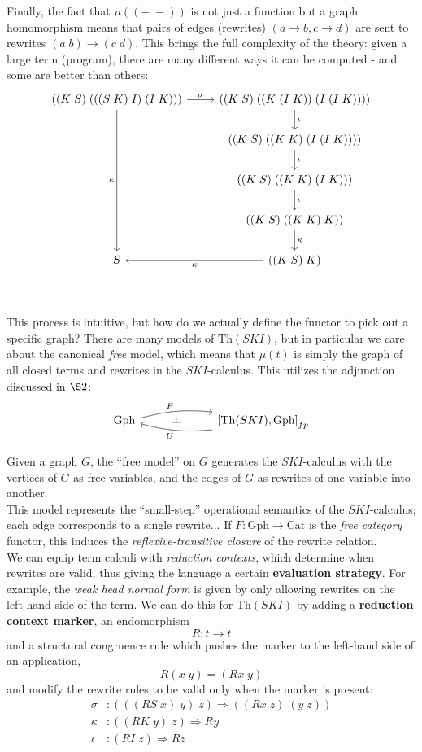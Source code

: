 \documentclass[a4paper,UKenglish]{article}
\theoremstyle{definition}
\def\ld{\rotatebox[origin=c]{-90}{$\dashv$}} %
\newcommand{\Th}{\mathrm{Th}}
\newcommand{\Gph}{\mathrm{Gph}}
\newcommand{\Cat}{\mathrm{Cat}}
\begin{document}
Finally, the fact that $\mu((-\;-))$ is not just a function but a graph homomorphism means that pairs of edges (rewrites) $(a\to b, c\to d)$ are sent to rewrites $(a\; b) \to (c\; d)$. This brings the full complexity of the theory: given a large term (program), there are many different ways it can be computed - and some are better than others:
\[\begin{tikzcd}
	((K\; S)\; (((S\; K)\; I)\; (I\; K))) \arrow[r,"\sigma"] \arrow[dddd,swap,"\kappa"] & ((K\; S)\; ((K\;(I\; K))\; (I\; (I\; K)))) \arrow[d,"\iota"]\\
	& ((K\; S)\; ((K\; K)\; (I\; (I\; K)))) \arrow[d,"\iota"]\\
	& ((K\; S)\; ((K\; K)\; (I\; K))) \arrow[d,"\iota"]\\
	& ((K\; S)\; ((K\; K)\; K)) \arrow[d,"\kappa"]\\
	S & ((K\; S)\; K)\arrow[l,"\kappa"]\\
\end{tikzcd}\]\\

This process is intuitive, but how do we actually define the functor to pick out a specific graph? There are many models of $\Th(SKI)$, but in particular we care about the canonical \textit{free} model, which means that $\mu(t)$ is simply the graph of all closed terms and rewrites in the $SKI$-calculus. This utilizes the adjunction discussed in $\S2$:
\[
\begin{tikzcd}
\Gph \arrow[bend left=10,below]{rr}{F}
& \ld &
\arrow[bend left=10,above]{ll}{U} \left[\Th(SKI),\Gph\right]_{fp}
\end{tikzcd}
\]

Given a graph $G$, the ``free model'' on $G$ generates the $SKI$-calculus with the vertices of $G$ as free variables, and the edges of $G$ as rewrites of one variable into another.\\

This model represents the ``small-step'' operational semantics of the $SKI$-calculus; each edge corresponds to a single rewrite... If $F: \Gph \to \Cat$ is the \textit{free category} functor, this induces the \textit{reflexive-transitive closure} of the rewrite relation.\\

We can equip term calculi with \textit{reduction contexts}, which determine when rewrites are valid, thus giving the language a certain \textbf{evaluation strategy}. For example, the \textit{weak head normal form} is given by only allowing rewrites on the left-hand side of the term. We can do this for $\Th(SKI)$ by adding a \textbf{reduction context marker}, an endomorphism $$R: t \to t$$ and a structural congruence rule which pushes the marker to the left-hand side of an application, $$R(x\; y) = (Rx\; y)$$ and modify the rewrite rules to be valid only when the marker is present: 
\[\begin{array}{rl}
\sigma & :(((RS\; x)\; y)\; z) \Rightarrow ((Rx\; z)\; (y\; z))\\
\kappa & :((RK\; y)\; z) \Rightarrow Ry\\
\iota & :(RI\; z) \Rightarrow Rz\\
\end{array}
\]
\end{document}
